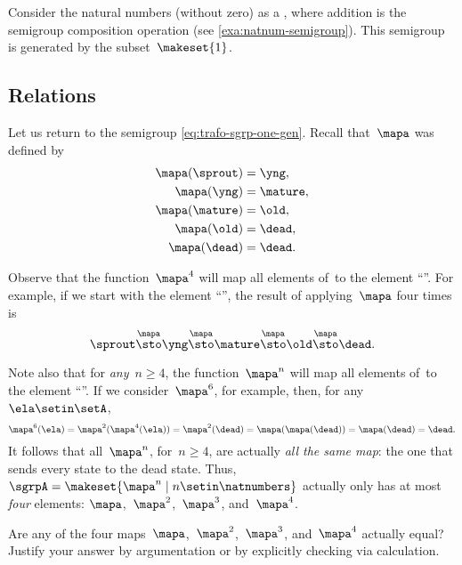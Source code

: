 \begin{example}
    Consider the natural numbers (without zero) as a   , where addition is the semigroup composition operation (see \cref{exa:natnum-semigroup}).
    This semigroup is generated by the subset~$\makeset{1 }$.
\end{example}

\subsection{Relations}

Let us return to the semigroup \cref{eq:trafo-sgrp-one-gen}.
Recall that~$\mapa$ was defined by
%
\begin{align}
    \mapa(\sprout) & =  \yng, \\
    \mapa(\yng)    & =  \mature, \\
    \mapa(\mature) & =  \old, \\
    \mapa( \old)   & = \dead, \\
    \mapa(\dead)   & = \dead.
\end{align}

Observe that the function~$\mapa^4$ will map all elements of~\setA to the element ``\dead''.
For example, if we start with the element ``\sprout'', the result of applying~$\mapa$ four times is
%
\begin{equation}
    \sprout \overset{\mapa}{\sto} \yng \overset{\mapa}{\sto} \mature \overset{\mapa}{\sto} \old \overset{\mapa}{\sto} \dead.
\end{equation}

Note also that for \emph{any}~$n \geq 4$, the function~$\mapa^n$ will map all elements of~\setA to the element ``\dead''.
If we consider~$\mapa^6$, for example, then, for any~$\ela \setin \setA$,
%
\begin{equation}
    \mapa^6(\ela) = \mapa^2(\mapa^4(\ela)) = \mapa^2(\dead) = \mapa(\mapa(\dead)) = \mapa(\dead) = \dead.
\end{equation}
%
It follows that all~$\mapa^n$, for~$n \geq 4$, are actually \emph{all the same map}: the one that sends every state to the dead state.
Thus, ~$\sgrpA = \makeset{ \mapa^n \mid n \setin \natnumbers }$ actually only has at most \emph{four} elements: $\mapa$,~$\mapa^2$,~$\mapa^3$, and~$\mapa^4$.

\begin{gradedexercise}
    \label{ex:CheckRelations}
    Are any of the four maps~$\mapa$,~$\mapa^2$,~$\mapa^3$, and~$\mapa^4$ actually equal?
    Justify your answer by argumentation or by explicitly checking via calculation.
\end{gradedexercise}

